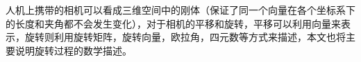 
人机上携带的相机可以看成三维空间中的刚体（保证了同一个向量在各个坐标系下的长度和夹角都不会发生变化），对于相机的平移和旋转，平移可以利用向量来表示，旋转则利用旋转矩阵，旋转向量，欧拉角，四元数等方式来描述，本文也将主要说明旋转过程的数学描述。

